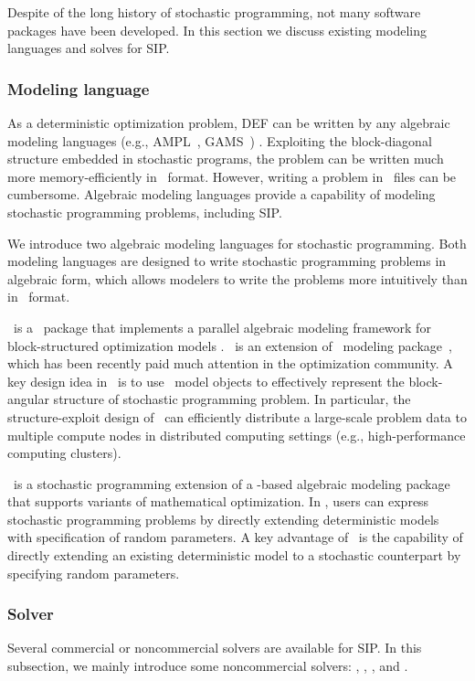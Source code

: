 Despite of the long history of stochastic programming, not many software packages have been developed. In this section we discuss existing modeling languages and solves for SIP. 

\subsubsection{Modeling language}

As a deterministic optimization problem, DEF can be written by any algebraic modeling languages (e.g., AMPL~\cite{web:AMPL}, GAMS~\cite{web:GAMS}) . Exploiting the block-diagonal structure embedded in stochastic programs, the problem can be written much more memory-efficiently in \smps\ format. However, writing a problem in \smps\ files can be cumbersome. Algebraic modeling languages provide a capability of modeling stochastic programming problems, including SIP.

We introduce two algebraic modeling languages for stochastic programming. Both modeling languages are designed to write stochastic programming problems in algebraic form, which allows modelers to write the problems more intuitively than in \smps\ format.

\structjump\ is a \julia\ package that implements a parallel algebraic modeling framework for block-structured optimization models \cite{web:StructJuMP}. \structjump\ is an extension of \jump\ modeling package~\cite{journal:JuMP}, which has been recently paid much attention in the optimization community. A key design idea in \structjump\ is to use \jump\ model objects to effectively represent the block-angular structure of stochastic programming problem. In particular, the structure-exploit design of \structjump\ can efficiently distribute a large-scale problem data to multiple compute nodes in distributed computing settings (e.g., high-performance computing clusters).

\pysp\ is a stochastic programming extension of a \python-based algebraic modeling package \pyomo\ \cite{book:pyomo} that supports variants of mathematical optimization. In \pysp, users can express stochastic programming problems by directly extending deterministic models with specification of random parameters. A key advantage of \pysp\ is the capability of directly extending an existing deterministic model to a stochastic counterpart by specifying random parameters. 

\subsubsection{Solver}
Several commercial or noncommercial solvers are available for SIP. In this subsection, we mainly introduce some noncommercial solvers: \pipssbb, \scip, \dsp, and \pysp.

